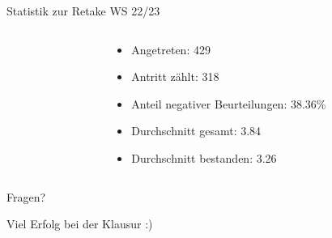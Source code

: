 \documentclass[
  german,            %
  aspectratio=169,    %
]{tumbeamer}
\begin{document}
\begin{frame}[fragile, c]{Statistik zur Retake WS 22/23}{}

  \begin{columns}[c]
    \begin{column}{0.5\textwidth}
    \end{column}
    \begin{column}{0.5\textwidth}
      \begin{itemize}
        \item Angetreten: 429
        \item Antritt zählt: 318
        \item Anteil negativer Beurteilungen: 38.36\%
        \item Durchschnitt gesamt: 3.84
        \item Durchschnitt bestanden: 3.26
      \end{itemize}
    \end{column}
  \end{columns}
\end{frame}

\begin{frame}[c]{}{}
  \begin{center}
    \LARGE Fragen?
  \end{center}
\end{frame}


\begin{frame}[c]{}{}
  \begin{center}
    \LARGE Viel Erfolg bei der Klausur :)
  \end{center}
\end{frame}

\maketitle
\end{document}
